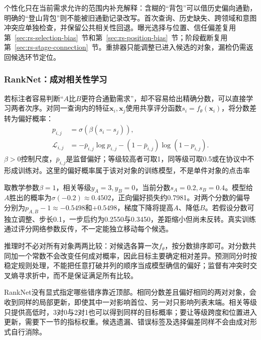个性化只在当前需求允许的范围内补充解释：含糊的“背包”可以借历史偏向通勤，明确的“登山背包”则不能被旧通勤记录改写。首次查询、历史缺失、跨领域和意图冲突应单独检查，并保留公共相关性回退。曝光选择与位置、信任偏差复用第~\ref{sec:rs-selection-bias}~节和第~\ref{sec:rs-position-bias}~节；阶段截断复用第~\ref{sec:rs-stage-connection}~节。重排器只能调整已进入候选的对象，漏检仍需返回候选环节定位。

\Needspace{100mm}
\subsubsection{RankNet：成对相关性学习}
\label{sec:rs-search-ranknet}

若标注者容易判断“$A$比$B$更符合通勤需求”，却不容易给出精确分数，可以直接学习两者次序。对同一查询内的特征$\bm x_i,\bm x_j$使用共享评分函数$s_i=f_\theta(\bm x_i)$，将分数差转为偏好概率：
\begin{equation}
 \begin{split}
 p_{i,j}&=\sigma(\beta(s_i-s_j)),\\
 \mathcal L_{i,j}&=-\bar p_{i,j}\log p_{i,j}
 -(1-\bar p_{i,j})\log(1-p_{i,j}).
 \end{split}
 \label{eq:rs-search-ranknet}
\end{equation}
$\beta>0$控制尺度，$\bar p_{i,j}$是监督偏好；等级较高者可取1，同等级可取0.5或在协议中不形成训练对。这里的偏好概率属于该对对象的训练模型，不是单件对象的点击率

取教学参数$\beta=1$，相关等级$y_A=3,y_B=0$，当前分数$s_A=0.2,s_B=0.4$。模型给$A$胜出的概率为$\sigma(-0.2)\approx0.4502$，正向偏好损失约0.7981。对两个分数的偏导分别为$p_{A,B}-1\approx-0.5498$和$+0.5498$，梯度下降将提高$A$、降低$B$。若假设分数可独立调整、步长0.1，一步后约为0.2550与0.3450，差距缩小但尚未反转。真实训练通过评分网络参数反传，不一定能独立移动每个候选。

推理时不必对所有对象两两比较：对候选各算一次$f_\theta$，按分数排序即可。对分数共同加一个常数不会改变任何成对概率，因此目标主要确定相对差异。预测同分时按稳定规则处理，不能把任意打破并列的顺序当成模型确信的偏好；监督有冲突时交叉熵寻求折中，而不是保证满足所有比较。

RankNet没有显式指定哪些错序靠近顶部。相同分数差且偏好相同的两对对象，会收到同样的局部更新，即使其中一对影响首位、另一对只影响列表末端。相关等级只提供高低时，3对0与2对1也可以得到同样的目标概率；要让等级跨度和位置进入更新，需要下一节的指标权重。候选遗漏、错误标签及选择偏差同样不会由成对形式自行消除。

